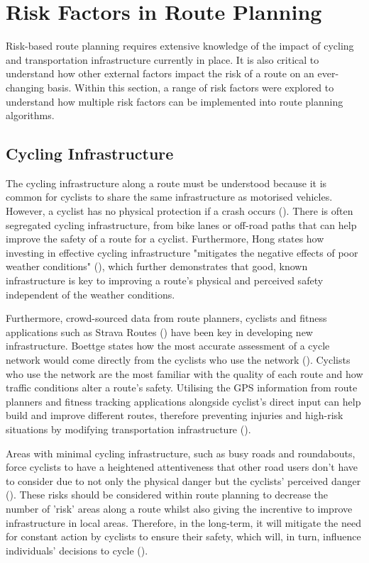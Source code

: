 \section{Risk Factors in Route Planning}
\label{litrev:riskfactors}
Risk-based route planning requires extensive knowledge of the impact of cycling and transportation infrastructure currently in place. It is also critical to understand how other external factors impact the risk of a route on an ever-changing basis. Within this section, a range of risk factors were explored to understand how multiple risk factors can be implemented into route planning algorithms.

\subsection{Cycling Infrastructure}
\label{litrev:cyclinginfrastructure}
The cycling infrastructure along a route must be understood because it is common for cyclists to share the same infrastructure as motorised vehicles. However, a cyclist has no physical protection if a crash occurs (\cite{reynolds_impact_2009}). There is often segregated cycling infrastructure, from bike lanes or off-road paths that can help improve the safety of a route for a cyclist. Furthermore, Hong states how investing in effective cycling infrastructure "mitigates the negative effects of poor weather conditions" (\cite{hong_can_2020}), which further demonstrates that good, known infrastructure is key to improving a route's physical and perceived safety independent of the weather conditions. 

Furthermore, crowd-sourced data from route planners, cyclists and fitness applications such as Strava Routes (\cite{noauthor_strava_nodate}) have been key in developing new infrastructure. Boettge states how the most accurate assessment of a cycle network would come directly from the cyclists who use the network (\cite{boettge_assessing_2017}). Cyclists who use the network are the most familiar with the quality of each route and how traffic conditions alter a route's safety. Utilising the GPS information from route planners and fitness tracking applications alongside cyclist's direct input can help build and improve different routes, therefore preventing injuries and high-risk situations by modifying transportation infrastructure (\cite{reynolds_impact_2009}).

Areas with minimal cycling infrastructure, such as busy roads and roundabouts, force cyclists to have a heightened attentiveness that other road users don't have to consider due to not only the physical danger but the cyclists' perceived danger (\cite{doorley_analysis_2015}). These risks should be considered within route planning to decrease the number of 'risk' areas along a route whilst also giving the increntive to improve infrastructure in local areas. Therefore, in the long-term, it will mitigate the need for constant action by cyclists to ensure their safety, which will, in turn, influence individuals' decisions to cycle (\cite{reynolds_impact_2009}).

